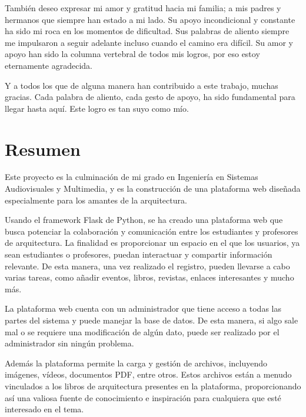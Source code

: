 \documentclass[a4paper, 12pt]{book}
\begin{document}
También deseo expresar mi amor y gratitud hacia mi familia; a mis padres y hermanos que siempre han estado a mi lado. 
Su apoyo incondicional y constante ha sido mi roca en los momentos de dificultad. Sus palabras de aliento siempre me 
impulsaron a seguir adelante incluso cuando el camino era difícil. Su amor y apoyo han sido la columna vertebral de 
todos mis logros, por eso estoy eternamente agradecida. 

Y a todos los que de alguna manera han contribuido a este trabajo, muchas gracias. Cada palabra de aliento, cada 
gesto de apoyo, ha sido fundamental para llegar hasta aquí. Este logro es tan suyo como mío.



\chapter*{Resumen}

Este proyecto es la culminación de mi grado en Ingeniería en Sistemas Audiovisuales y Multimedia, y es la construcción de una 
plataforma web diseñada especialmente para los amantes de la arquitectura. 

Usando el framework Flask de Python, se ha creado una plataforma web que busca potenciar la colaboración y comunicación entre los estudiantes y profesores 
de arquitectura. La finalidad es proporcionar un espacio en el que los usuarios, ya sean estudiantes o profesores, puedan interactuar y 
compartir información relevante. De esta manera, una vez realizado el registro, pueden llevarse a cabo varias tareas, como añadir 
eventos, libros, revistas, enlaces interesantes y mucho más.

La plataforma web cuenta con un administrador que tiene acceso a todas las partes del sistema y puede manejar la base de datos. De esta 
manera, si algo sale mal o se requiere una modificación de algún dato, puede ser realizado por el administrador sin ningún problema.

Además la plataforma permite la carga y gestión de archivos, incluyendo imágenes, vídeos, documentos PDF, entre otros. Estos 
archivos están a menudo vinculados a los libros de arquitectura presentes en la plataforma, proporcionando así una valiosa fuente de 
conocimiento e inspiración para cualquiera que esté interesado en el tema. 
\end{document}
